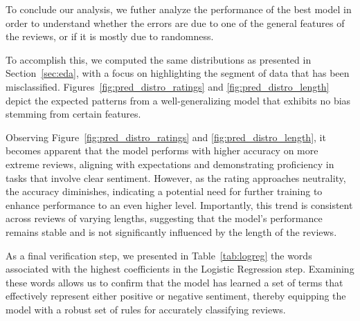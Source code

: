 To conclude our analysis, we futher analyze the performance of the best model in order to understand whether the errors are due to one of the general features of the reviews, or if it is mostly due to randomness.

To accomplish this, we computed the same distributions as presented in Section~\ref{sec:eda}, with a focus on highlighting the segment of data that has been misclassified. Figures~\ref{fig:pred_distro_ratings} and \ref{fig:pred_distro_length} depict the expected patterns from a well-generalizing model that exhibits no bias stemming from certain features.

Observing Figure~\ref{fig:pred_distro_ratings} and \ref{fig:pred_distro_length}, it becomes apparent that the model performs with higher accuracy on more extreme reviews, aligning with expectations and demonstrating proficiency in tasks that involve clear sentiment. However, as the rating approaches neutrality, the accuracy diminishes, indicating a potential need for further training to enhance performance to an even higher level. Importantly, this trend is consistent across reviews of varying lengths, suggesting that the model's performance remains stable and is not significantly influenced by the length of the reviews.

As a final verification step, we presented in Table~\ref{tab:logreg} the words associated with the highest coefficients in the Logistic Regression step. Examining these words allows us to confirm that the model has learned a set of terms that effectively represent either positive or negative sentiment, thereby equipping the model with a robust set of rules for accurately classifying reviews.



